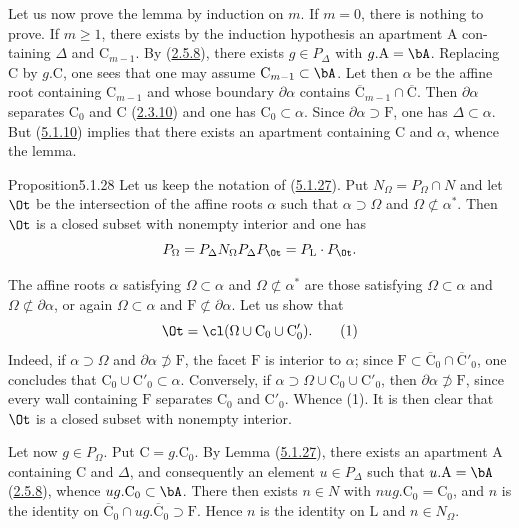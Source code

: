 \documentclass[12pt,a4paper,oneside,english]{smfart}
\makeatletter
\newcommand{\btanchor}[1]{\leavevmode\Hy@raisedlink{\hypertarget{bt:#1}{}}}
\newcommand{\btpageanchor}[1]{\Hy@raisedlink{\hypertarget{p:#1}{}}}
\newcommand{\btref}[1]{\hyperlink{bt:#1}{#1}}
\newcommand{\btpage}[1]{\marginnote{p.~#1}\btpageanchor{#1}}
\newcommand{\pg}[1]{\btpage{#1}}
\theoremstyle{definition}
\theoremstyle{bt}
\makeatother
\begin{document}
Let us now prove the lemma by induction on $m$. If $m=0$, there is nothing to
prove. If $m\geqslant1$, there exists by the induction hypothesis an apartment
$\mathrm{A}$ con-\pg{94}taining $\Delta$ and $\mathrm{C}_{m-1}$. By (\btref{2.5.8}),
there exists $g\in P_{\Delta}$ with $g.\mathrm{A}=\bA$. Replacing $\mathrm{C}$
by $g.\mathrm{C}$, one sees that one may assume $\mathrm{C}_{m-1}\subset\bA$.
Let then $\alpha$ be the affine root containing $\mathrm{C}_{m-1}$ and whose
boundary $\partial\alpha$ contains
$\overline{\mathrm{C}}_{m-1}\cap\overline{\mathrm{C}}$. Then $\partial\alpha$
separates $\mathrm{C}_{0}$ and $\mathrm{C}$ (\btref{2.3.10}) and one has
$\mathrm{C}_{0}\subset\alpha$. Since $\partial\alpha\supset \mathrm{F}$, one has
$\Delta\subset\alpha$. But (\btref{5.1.10}) implies that there exists an apartment
containing $\mathrm{C}$ and $\alpha$, whence the lemma.

\begin{btstat}{Proposition}{5.1.28}\btanchor{5.1.28}
Let us keep the notation of \textup{(\btref{5.1.27})}. Put $N_{\Omega}=P_{\Omega}\cap N$
and let $\Ot$ be the intersection of the affine roots $\alpha$ such that
$\alpha\supset\Omega$ and $\Omega\not\subset\alpha^{*}$. Then $\Ot$ is a closed
subset with nonempty interior and one has
\[
P_{\Omega}=P_{\Delta}N_{\Omega}P_{\Delta}P_{\Ot}=P_{\mathrm{L}}\cdot P_{\Ot}.
\]
\end{btstat}

The affine roots $\alpha$ satisfying $\Omega\subset\alpha$ and
$\Omega\not\subset\alpha^{*}$ are those satisfying $\Omega\subset\alpha$ and
$\Omega\not\subset\partial\alpha$, or again $\Omega\subset\alpha$ and
$\mathrm{F}\not\subset\partial\alpha$. Let us show that
\begin{equation*}
\Ot=\cl(\Omega\cup \mathrm{C}_{0}\cup \mathrm{C}'_{0}).\tag{1}
\end{equation*}
Indeed, if $\alpha\supset\Omega$ and $\partial\alpha\not\supset \mathrm{F}$, the
facet $\mathrm{F}$ is interior to $\alpha$; since
$\mathrm{F}\subset\overline{\mathrm{C}}_{0}\cap\overline{\mathrm{C}}'_{0}$, one
concludes that $\mathrm{C}_{0}\cup \mathrm{C}'_{0}\subset\alpha$. Conversely, if
$\alpha\supset\Omega\cup \mathrm{C}_{0}\cup \mathrm{C}'_{0}$, then
$\partial\alpha\not\supset \mathrm{F}$, since every wall containing $\mathrm{F}$
separates $\mathrm{C}_{0}$ and $\mathrm{C}'_{0}$. Whence (1). It is then clear
that $\Ot$ is a closed subset with nonempty interior.

Let now $g\in P_{\Omega}$. Put $\mathrm{C}=g.\mathrm{C}_{0}$. By Lemma (\btref{5.1.27}),
there exists an apartment $\mathrm{A}$ containing $\mathrm{C}$ and $\Delta$, and
consequently an element $u\in P_{\Delta}$ such that $u.\mathrm{A}=\bA$ (\btref{2.5.8}),
whence $ug.\mathrm{C}_{0}\subset\bA$. There then exists $n\in N$ with
$nug.\mathrm{C}_{0}=\mathrm{C}_{0}$, and $n$ is the identity on
$\overline{\mathrm{C}}_{0}\cap ug.\overline{\mathrm{C}}_{0}\supset \mathrm{F}$.
Hence $n$ is the identity on $\mathrm{L}$ and $n\in N_{\Omega}$.
\end{document}
